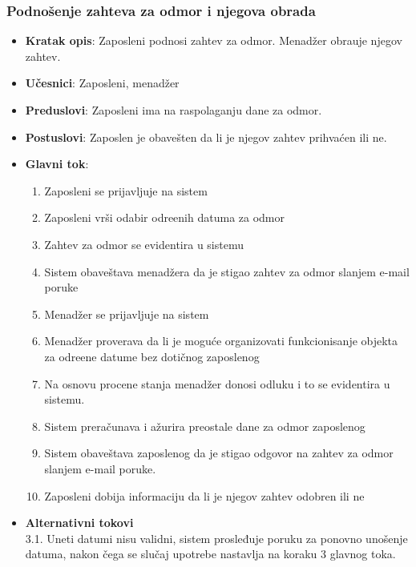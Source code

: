   \subsubsection{Podno\v senje zahteva za odmor i njegova obrada }
 \begin{itemize}
    \item \textbf{Kratak opis}:
   Zaposleni podnosi zahtev za odmor. Menad\v zer obra\dj uje njegov zahtev.
    \item \textbf{Učesnici}:
    Zaposleni, menad\v zer
    \item \textbf{Preduslovi}: Zaposleni ima na raspolaganju dane za odmor.
    \item \textbf{Postuslovi}:
    Zaposlen je obave\v sten da li je njegov zahtev prihva\'cen ili ne.
    \item \textbf{Glavni tok}:
    \begin{enumerate}
        \item Zaposleni se prijavljuje na sistem
        \item Zaposleni vr\v si odabir odre\dj enih datuma za odmor
        \item Zahtev za odmor se evidentira u sistemu 
        \item Sistem obave\v stava menad\v zera da je stigao zahtev za odmor slanjem e-mail poruke
        \item Menad\v zer se prijavljuje na sistem
        \item Menad\v zer proverava da li je moguće organizovati funkcionisanje objekta za odre\dj ene datume bez dotičnog zaposlenog
        \item Na osnovu procene stanja menad\v zer donosi odluku i to se evidentira u sistemu.
        \item Sistem prera\v cunava i a\v zurira preostale dane za odmor zaposlenog
        \item Sistem obave\v stava zaposlenog da je stigao odgovor na zahtev za odmor slanjem e-mail poruke.
        \item Zaposleni dobija informaciju da li je njegov zahtev odobren ili ne
    \end{enumerate}
\item \textbf{Alternativni tokovi}\\
        3.1. Uneti datumi nisu validni, sistem prosleđuje poruku za ponovno unošenje datuma, nakon čega se slučaj upotrebe nastavlja na koraku 3 glavnog toka.

 \end{itemize}
 
